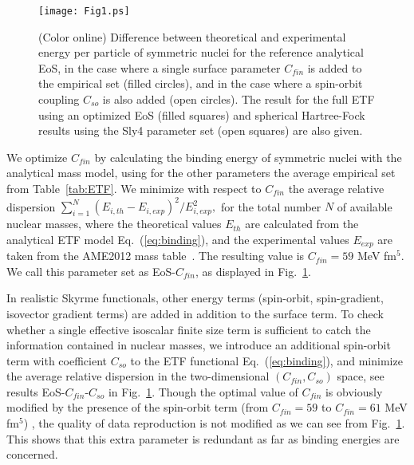 \documentclass
[aps,prc,twocolumn,showpacs,showkeys,amsmath,floatfix,superscriptaddress]{revtex4}
\begin{document}
{\begin{figure}[htbp]
    \begin{center}
\texttt{[image: Fig1.ps]}
      \caption{(Color online) Difference between theoretical and experimental  energy per particle of symmetric nuclei for the reference analytical EoS,
      in the case where a single surface parameter $C_{fin}$ is added to the empirical set (filled circles), and in the case where a spin-orbit
      coupling $C_{so}$ is also added (open circles).  
      The result for the full ETF using an optimized EoS (filled squares) and spherical Hartree-Fock results using the Sly4 \cite{Sly4}
parameter 
      set (open squares) are also given.
      }\label{fig:aabdiff_eosopt}
      \end{center}
\end{figure}


We optimize $C_{fin}$ by calculating the binding energy of symmetric nuclei with the analytical mass model, using for the other parameters the average empirical set from Table~\ref{tab:ETF}. 
We minimize with respect to $C_{fin}$ the average relative dispersion 
$\sum_{i=1}^N (E_{i,th}-E_{i,exp})^2/E_{i,exp}^2,$
for the total number $N$ of available nuclear masses, 
where the theoretical values $E_{th}$ are calculated 
from the analytical ETF model Eq.~(\ref{eq:binding}), and the experimental values $E_{exp}$ are taken from the AME2012 mass table~\cite{AME2012}.
The resulting value is $C_{fin}=59$ MeV fm$^5$. We call this parameter set as EoS-$C_{fin}$, as displayed in Fig.~\ref{fig:aabdiff_eosopt}.

In realistic Skyrme functionals, other energy terms (spin-orbit, spin-gradient, isovector gradient terms) are added in addition to the surface term.  To check whether a single effective isoscalar finite size term is sufficient to catch the information contained in nuclear masses, we introduce an additional spin-orbit term with coefficient $C_{so}$ to the ETF functional Eq.~(\ref{eq:binding}), and minimize the average relative dispersion in the two-dimensional 
$(C_{fin}, C_{so})$ space, see results EoS-$C_{fin}$-$C_{so}$ in Fig.~\ref{fig:aabdiff_eosopt}. 
Though the optimal value of $C_{fin}$ is obviously modified by the presence of the spin-orbit term (from $C_{fin}=59$ to $C_{fin}=61$ MeV fm$^5$) , the  quality of data reproduction is not modified as we can see from Fig.~\ref{fig:aabdiff_eosopt}. This shows that this extra parameter is redundant as far as binding energies are concerned.

}
\end{document}
